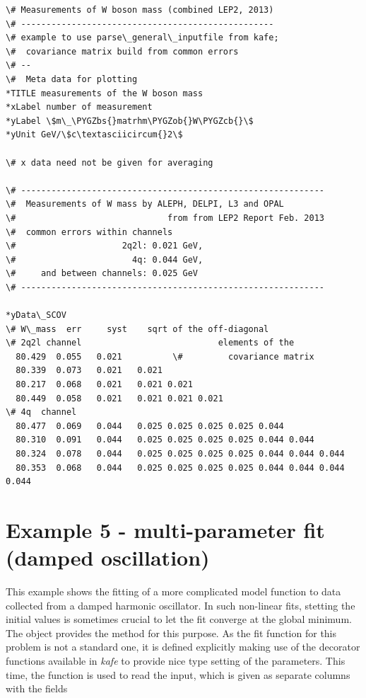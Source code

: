 \documentclass[a4paper,10pt,english]{sphinxmanual}
\def\PYGZbs{\char`\\}
\def\PYGZob{\char`\{}
\def\PYGZcb{\char`\}}
\begin{document}
\begin{Verbatim}[commandchars=\\\{\}]
\# Measurements of W boson mass (combined LEP2, 2013)
\# --------------------------------------------------
\# example to use parse\_general\_inputfile from kafe;
\#  covariance matrix build from common errors
\# --
\#  Meta data for plotting
*TITLE measurements of the W boson mass
*xLabel number of measurement
*yLabel \$m\_\PYGZbs{}matrhm\PYGZob{}W\PYGZcb{}\$
*yUnit GeV/\$c\textasciicircum{}2\$

\# x data need not be given for averaging

\# ------------------------------------------------------------
\#  Measurements of W mass by ALEPH, DELPI, L3 and OPAL
\#                              from from LEP2 Report Feb. 2013
\#  common errors within channels
\#                     2q2l: 0.021 GeV,
\#                       4q: 0.044 GeV,
\#     and between channels: 0.025 GeV
\# ------------------------------------------------------------

*yData\_SCOV
\# W\_mass  err     syst    sqrt of the off-diagonal
\# 2q2l channel                           elements of the
  80.429  0.055   0.021          \#         covariance matrix
  80.339  0.073   0.021   0.021
  80.217  0.068   0.021   0.021 0.021
  80.449  0.058   0.021   0.021 0.021 0.021
\# 4q  channel
  80.477  0.069   0.044   0.025 0.025 0.025 0.025 0.044
  80.310  0.091   0.044   0.025 0.025 0.025 0.025 0.044 0.044
  80.324  0.078   0.044   0.025 0.025 0.025 0.025 0.044 0.044 0.044
  80.353  0.068   0.044   0.025 0.025 0.025 0.025 0.044 0.044 0.044 0.044
\end{Verbatim}


\section{Example 5 - multi-parameter fit (damped oscillation)}
\label{index:example-5-multi-parameter-fit-damped-oscillation}
This example shows the fitting of a more complicated model function
to data collected from a damped harmonic oscillator. In such
non-linear fits, stetting the initial values is sometimes crucial
to let the fit converge at the global minimum. The  object
provides the method  for this purpose. As the
fit function for this problem is not a standard one, it is defined
explicitly making use of the decorator functions available in \emph{kafe}
to provide nice type setting of the parameters. This time, the
function  is used to read the input,
which is given as separate columns with the fields
\begin{quote}

\end{quote}
\end{document}
